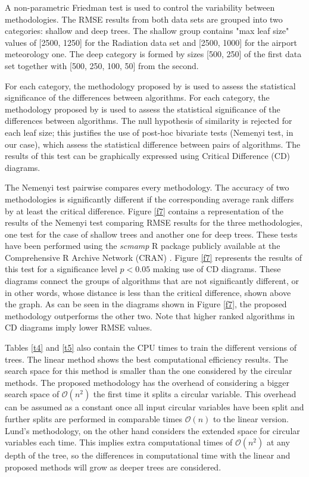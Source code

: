 \documentclass[times,twocolumn,final,authoryear]{elsarticle}
\begin{document}
A non-parametric Friedman test is used to control the variability between methodologies. The RMSE results from both data sets are grouped into two categories: shallow and deep trees. The shallow group contains "max leaf size" values of [2500, 1250] for the Radiation data set and [2500, 1000] for the airport meteorology one. The deep category is formed by sizes [500, 250] of the first data set together with [500, 250, 100, 50] from the second.

For each category, the methodology proposed by \citep{Demsar2006} is used to assess the statistical significance of the differences between algorithms. For each category, the methodology proposed by \citep{Demsar2006} is used to assess the statistical significance of the differences between algorithms. The null hypothesis of similarity is rejected for each leaf size; this justifies the use of post-hoc bivariate tests (Nemenyi test, in our case), which assess the statistical difference between pairs of algorithms. The results of this test can be graphically expressed using Critical Difference (CD) diagrams.

The Nemenyi test pairwise compares every methodology. The accuracy of two methodologies is significantly different if the corresponding average rank differs by at least the critical difference. Figure \ref{f7} contains a representation of the results of the Nemenyi test comparing RMSE results for the three methodologies, one test for the case of shallow trees and another one for deep trees. These tests have been performed using the \textit{scmamp} R package publicly available at the Comprehensive R Archive Network (CRAN) \citep{Calvo2015}. Figure \ref{f7} represents the results of this test for a significance level $ p < 0.05 $ making use of CD diagrams.  These diagrams connect the groups of algorithms that are not significantly different, or in other words, whose distance is less than the critical difference, shown above the graph. As can be seen in the diagrams shown in Figure \ref{f7}, the proposed methodology outperforms the other two. Note that higher ranked algorithms in CD diagrams imply lower RMSE values.

Tables \ref{t4} and \ref{t5} also contain the CPU times to train the different versions of trees. The linear method shows the best computational efficiency results. The search space for this method is smaller than the one considered by the circular methods. The proposed methodology has the overhead of considering a bigger search space of $\mathcal{O}(n^2)$ the first time it splits a circular variable. This overhead can be assumed as a constant once all input circular variables have been split and further splits are performed in comparable times $\mathcal{O}(n)$ to the linear version. Lund's methodology, on the other hand considers the extended space for circular variables each time. This implies extra computational times of $\mathcal{O}(n^2)$ at any depth of the tree, so the differences in computational time with the linear and proposed methods will grow as deeper trees are considered.
\end{document}
